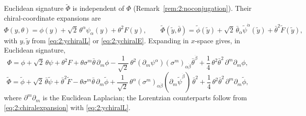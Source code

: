 Euclidean signature $\widetilde\Phi$ is independent of $\Phi$
(Remark~\ref{rem:2:noconjugation}). Their chiral-coordinate expansions are
\begin{equation}
\Phi(y,\theta)=\phi(y)+\sqrt2\,\theta^\alpha\psi_\alpha(y)+\theta^2F(y),
\qquad
\widetilde\Phi(\widetilde y,\bar\theta)
=\widetilde\phi(\widetilde y)
+\sqrt2\,\bar\theta_{\dot\alpha}\widetilde\psi^{\dot\alpha}(\widetilde y)
+\bar\theta^2\widetilde F(\widetilde y),
\label{eq:2:chiralexpansion}
\end{equation}
with $y,\widetilde y$ from \eqref{eq:2:ychiralL} or \eqref{eq:2:ychiralE}.
Expanding in $x$-space gives, in Euclidean signature,
\begin{equation}
\Phi=\phi+\sqrt2\,\theta\psi+\theta^2F
+\theta\sigma^m\bar\theta\,\partial_m\phi
-\frac1{\sqrt2}\,\theta^2
(\partial_m\psi^\alpha)(\sigma^m)_{\alpha\dot\beta}\bar\theta^{\dot\beta}
+\frac14\,\theta^2\bar\theta^2\,\partial^m\partial_m\phi ,
\label{eq:2:chiralxE}
\end{equation}
\begin{equation}
\widetilde\Phi=\widetilde\phi
+\sqrt2\,\bar\theta\widetilde\psi
+\bar\theta^2\widetilde F
-\theta\sigma^m\bar\theta\,\partial_m\widetilde\phi
+\frac1{\sqrt2}\,\theta^\alpha(\sigma^m)_{\alpha\dot\beta}
(\partial_m\widetilde\psi^{\dot\beta})\,\bar\theta^2
+\frac14\,\theta^2\bar\theta^2\,\partial^m\partial_m\widetilde\phi ,
\label{eq:2:antichiralxE}
\end{equation}
where $\partial^m\partial_m$ is the Euclidean Laplacian; the Lorentzian
counterparts follow from \eqref{eq:2:chiralexpansion} with
\eqref{eq:2:ychiralL}.

